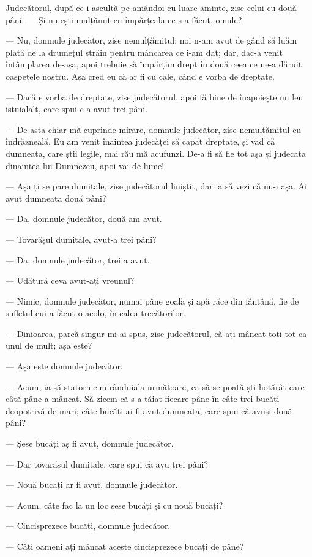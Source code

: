 \documentclass[12pt, a4paper, oneside, romanian]{teza-upb}
\begin{document}
Judecătorul, după ce-i ascultă pe amândoi cu luare aminte, zise celui cu două pâni: — Și nu ești mulțămit cu împărțeala ce s-a făcut, omule?

— Nu, domnule judecător, zise nemulțămitul; noi n-am avut de gând să luăm plată de la drumețul străin pentru mâncarea ce i-am dat; dar, dac-a venit întâmplarea de-așa, apoi trebuie să împărțim drept în două ceea ce ne-a dăruit oaspetele nostru. Așa cred eu că ar fi cu cale, când e vorba de dreptate.

— Dacă e vorba de dreptate, zise judecătorul, apoi fă bine de înapoiește un leu istuialalt, care spui c-a avut trei pâni.

— De asta chiar mă cuprinde mirare, domnule judecător, zise nemulțămitul cu îndrăzneală. Eu am venit înaintea judecăței să capăt dreptate, și văd că dumneata, care știi legile, mai rău mă acufunzi. De-a fi să fie tot așa și judecata dinaintea lui Dumnezeu, apoi vai de lume!

— Așa ți se pare dumitale, zise judecătorul liniștit, dar ia să vezi că nu-i așa. Ai avut dumneata două pâni?

— Da, domnule judecător, două am avut.

— Tovarășul dumitale, avut-a trei pâni?

— Da, domnule judecător, trei a avut.

— Udătură ceva avut-ați vreunul?

— Nimic, domnule judecător, numai pâne goală și apă răce din fântână, fie de sufletul cui a făcut-o acolo, în calea trecătorilor.

— Dinioarea, parcă singur mi-ai spus, zise judecătorul, că ați mâncat toți tot ca unul de mult; așa este?

— Așa este domnule judecător.

— Acum, ia să statornicim rânduiala următoare, ca să se poată ști hotărât care câtă pâne a mâncat. Să zicem că s-a tăiat fiecare pâne în câte trei bucăți deopotrivă de mari; câte bucăți ai fi avut dumneata, care spui că avuși două pâni?

— Șese bucăți aș fi avut, domnule judecător.

— Dar tovarășul dumitale, care spui că avu trei pâni?

— Nouă bucăți ar fi avut, domnule judecător.

— Acum, câte fac la un loc șese bucăți și cu nouă bucăți?

— Cincisprezece bucăți, domnule judecător.

— Câți oameni ați mâncat aceste cincisprezece bucăți de pâne?
\end{document}
